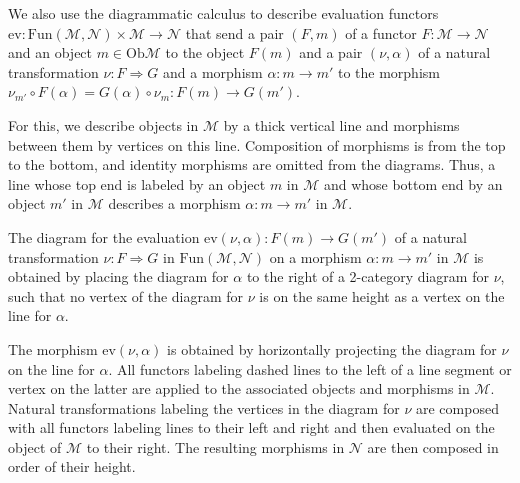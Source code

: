 \documentclass[1.5pt, a4paper]{article}
\newcommand{\mam}{\mathcal M}
\newcommand{\man}{\mathcal N}
\newcommand{\Ob}{\mathrm{Ob}}
\newcommand{\Fun}{\mathrm{Fun}}
\begin{document}
We also use the diagrammatic calculus to describe   evaluation functors $\mathrm{ev}: \Fun(\mam,\man)\times \mam\to \man$ that send a pair $(F,m)$ of a functor $F:\mam\to\man$ and an object $m\in\Ob\mam$ to the object $F(m)$ and a pair $(\nu,\alpha)$ of a natural transformation $\nu: F\Rightarrow G$ and a morphism $\alpha:m\to m'$ to the morphism
$\nu_{m'}\circ F(\alpha)=G(\alpha)\circ \nu_m: F(m)\to G(m')$. 

For this, we describe objects  in $\mam$ by a thick  vertical line and morphisms between them by  vertices on this line. 
Composition of morphisms is from the top to the bottom, and identity morphisms are omitted from the diagrams. Thus, a line whose top end is labeled by an object $m$ in $\mam$ and whose bottom end by an object $m'$ in $\mam$ describes a morphism $\alpha:m\to m'$ in $\mam$. 

The diagram for the evaluation $\mathrm{ev}(\nu,\alpha): F(m)\to G(m')$ of a natural transformation $\nu: F\Rightarrow G$ in $\Fun(\mam,\man)$ on 
a  morphism $\alpha:m\to m'$ in $\mam$  is obtained by placing the  diagram for $\alpha$  
to the right of  a 2-category diagram  for  $\nu$, such that no vertex of the diagram for $\nu$ is on the same height as a vertex on the line for $\alpha$.
 
The morphism $\mathrm{ev}(\nu,\alpha)$  is obtained by horizontally projecting the diagram for $\nu$ on the line for $\alpha$.  All functors labeling dashed lines to the left of a line segment or vertex on the latter  are applied to the associated objects and morphisms in $\mam$.  Natural transformations labeling the vertices  in the diagram for $\nu$ are composed with all functors labeling lines to their left and right  and then evaluated  on the object of $\mam$ to their right. The resulting morphisms in $\man$ are then composed in order of their height.
\end{document}
